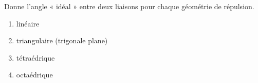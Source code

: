 \documentclass[11pt,a4paper]{article}
\begin{document}
\begin{exo}
Donne l'angle « idéal » entre deux liaisons pour chaque géométrie de répulsion.
\begin{enumerate}[label=\alph*)]
  \item linéaire
  \item triangulaire (trigonale plane)
  \item tétraédrique
  \item octaédrique
\end{enumerate}
\end{exo}
\end{document}

